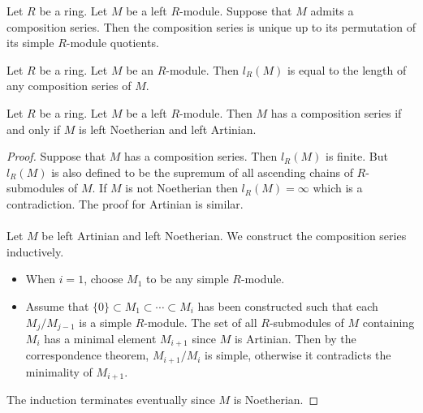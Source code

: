 \documentclass[a4paper]{article}
\begin{document}
\begin{prp}{}{} Let $R$ be a ring. Let $M$ be a left $R$-module. Suppose that $M$ admits a composition series. Then the composition series is unique up to its permutation of its simple $R$-module quotients. 
\end{prp}

\begin{prp}{}{} Let $R$ be a ring. Let $M$ be an $R$-module. Then $l_R(M)$ is equal to the length of any composition series of $M$. 
\end{prp}

\begin{prp}{}{} Let $R$ be a ring. Let $M$ be a left $R$-module. Then $M$ has a composition series if and only if $M$ is left Noetherian and left Artinian. \tcbline
\begin{proof}
Suppose that $M$ has a composition series. Then $l_R(M)$ is finite. But $l_R(M)$ is also defined to be the supremum of all ascending chains of $R$-submodules of $M$. If $M$ is not Noetherian then $l_R(M)=\infty$ which is a contradiction. The proof for Artinian is similar. \\~\\

Let $M$ be left Artinian and left Noetherian. We construct the composition series inductively. 
\begin{itemize}
\item When $i=1$, choose $M_1$ to be any simple $R$-module. 
\item Assume that $\{0\}\subset M_1\subset\cdots\subset M_i$ has been constructed such that each $M_j/M_{j-1}$ is a simple $R$-module. The set of all $R$-submodules of $M$ containing $M_i$ has a minimal element $M_{i+1}$ since $M$ is Artinian. Then by the correspondence theorem, $M_{i+1}/M_i$ is simple, otherwise it contradicts the minimality of $M_{i+1}$. 
\end{itemize}
The induction terminates eventually since $M$ is Noetherian. 
\end{proof}
\end{prp}
\end{document}
